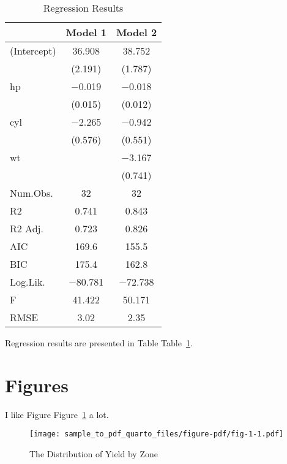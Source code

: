 \documentclass[
  12pt,
  letterpaper,
  DIV=11,
  numbers=noendperiod]{scrartcl}
\begin{document}
\hypertarget{tbl-reg-table}{}
\begin{table}[H]
\caption{\label{tbl-reg-table}Regression Results }\tabularnewline

\centering
\begin{tabular}[t]{lcc}
\toprule
  & Model 1 & Model 2\\
\midrule
(Intercept) & \num{36.908} & \num{38.752}\\
 & (\num{2.191}) & (\num{1.787})\\
hp & \num{-0.019} & \num{-0.018}\\
 & (\num{0.015}) & (\num{0.012})\\
cyl & \num{-2.265} & \num{-0.942}\\
 & (\num{0.576}) & (\num{0.551})\\
wt &  & \num{-3.167}\\
 &  & (\num{0.741})\\
\midrule
Num.Obs. & \num{32} & \num{32}\\
R2 & \num{0.741} & \num{0.843}\\
R2 Adj. & \num{0.723} & \num{0.826}\\
AIC & \num{169.6} & \num{155.5}\\
BIC & \num{175.4} & \num{162.8}\\
Log.Lik. & \num{-80.781} & \num{-72.738}\\
F & \num{41.422} & \num{50.171}\\
RMSE & \num{3.02} & \num{2.35}\\
\bottomrule
\end{tabular}
\end{table}

Regression results are presented in Table Table~\ref{tbl-reg-table}.

\newpage

\hypertarget{figures}{%
\section{Figures}\label{figures}}

I like Figure Figure~\ref{fig-1} a lot.

\begin{figure}[H]

{\centering \texttt{[image: sample\_to\_pdf\_quarto\_files/figure-pdf/fig-1-1.pdf]}

}

\caption{\label{fig-1}The Distribution of Yield by Zone}

\end{figure}
\end{document}
